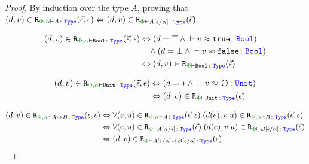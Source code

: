 \begin{proof}
    By induction over the type $A$, proving that $\inLogRel{d}{v}{\P,\a}{A}{\ev, \e} \Leftrightarrow \inLogRelPE{d}{v}{A\ssub{\a}{\e}}$.

            \begin{align*}
                \inLogRel{d}{v}{\P,\a}{\B}{\ev, \e} & \Leftrightarrow (d = \top \wedge \zberelation{v}{\t}{\B})
                \\ 
                & \quad\wedge(d = \bot \wedge \zberelation{v}{\f}{\B})
                \\
                & \Leftrightarrow  \inLogRelPE{d}{v}{\B}
            \end{align*}
    
        \begin{align*}
            \inLogRel{d}{v}{\P,\a}{\U}{\ev, \e} & \Leftrightarrow (d = \singleton \wedge \zberelation{v}{\u}{\U})
            \\
            & \Leftrightarrow  \inLogRelPE{d}{v}{\U}
        \end{align*}
    
        \case{\tfun}
        \begin{align*}
            \inLogRel{d}{v}{\P,\a}{\ab}{\ev, \e} & \Leftrightarrow \forall\inLogRel{e}{u}{\P,\a}{A}{\ev, \e}. \inLogRel{d(e)}{\apply{v}{u}}{\P,\a}{B}{\ev, \e} 
            \\
            & \Leftrightarrow 
            \forall\inLogRelPE{e}{u}{A\ssub{\e}{\a}}. \inLogRelPE{d(e)}{\apply{v}{u}}{B\ssub{\a}{\e}}
            \\
            & \Leftrightarrow  \inLogRelPE{d}{v}{\fntype{A\ssub{\a}{\e}}{B\ssub{\a}{\e}}}
            \\
        \end{align*}
    
        \case{\teffect}
    

\end{proof}
